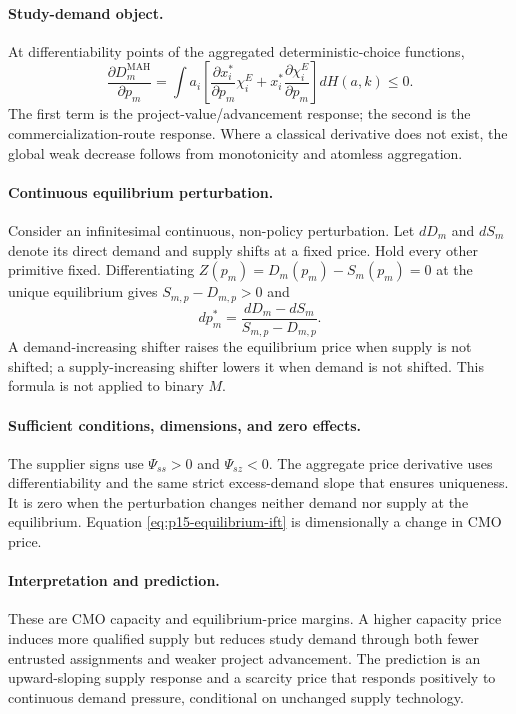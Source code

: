 \paragraph{Study-demand object.}
At differentiability points of the aggregated deterministic-choice functions,
\begin{equation}
  \frac{\partial D_m^{\mathrm{MAH}}}{\partial p_m}
  =
  \int a_i
  \left[
    \frac{\partial x_i^*}{\partial p_m}\chi_i^E
    +
    x_i^*\frac{\partial\chi_i^E}{\partial p_m}
  \right]dH(a,k)
  \leq0.
  \label{eq:p15-study-demand-slope}
\end{equation}
The first term is the project-value/advancement response; the second is the
commercialization-route response. Where a classical derivative does not
exist, the global weak decrease follows from monotonicity and atomless
aggregation.

\paragraph{Continuous equilibrium perturbation.}
Consider an infinitesimal continuous, non-policy perturbation. Let
\(dD_m\) and \(dS_m\) denote its direct demand and supply shifts at a fixed
price. Hold every other primitive fixed. Differentiating
\(Z(p_m)=D_m(p_m)-S_m(p_m)=0\) at the unique equilibrium gives
\(S_{m,p}-D_{m,p}>0\) and
\begin{equation}
  dp_m^*
  =
  \frac{dD_m-dS_m}
       {S_{m,p}-D_{m,p}}.
  \label{eq:p15-equilibrium-ift}
\end{equation}
A demand-increasing shifter raises the equilibrium price when supply is not
shifted; a supply-increasing shifter lowers it when demand is not shifted.
This formula is not applied to binary \(M\).

\paragraph{Sufficient conditions, dimensions, and zero effects.}
The supplier signs use \(\Psi_{ss}>0\) and \(\Psi_{sz}<0\). The aggregate
price derivative uses differentiability and the same strict excess-demand
slope that ensures uniqueness. It is zero when the perturbation changes
neither demand nor supply at the equilibrium. Equation
\eqref{eq:p15-equilibrium-ift} is dimensionally a change in CMO price.

\paragraph{Interpretation and prediction.}
These are CMO capacity and equilibrium-price margins. A higher capacity price
induces more qualified supply but reduces study demand through both fewer
entrusted assignments and weaker project advancement. The prediction is an
upward-sloping supply response and a scarcity price that responds positively
to continuous demand pressure, conditional on unchanged supply technology.

